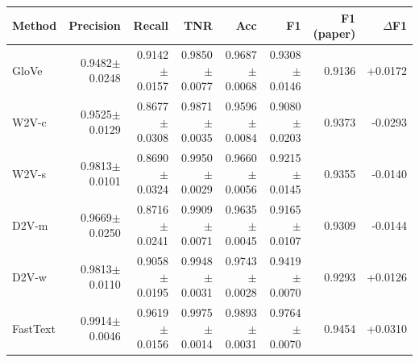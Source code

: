 \begin{tabular}{@{}lrrrrrrr@{}}
\toprule
Method & Precision & Recall & TNR & Acc & F1 & F1 (paper) & $\Delta$F1 \\ \midrule
GloVe & 0.9482$\pm$0.0248 & 0.9142$\pm$0.0157 & 0.9850$\pm$0.0077 & 0.9687$\pm$0.0068 & 0.9308$\pm$0.0146 & 0.9136 & +0.0172 \\
W2V-c & 0.9525$\pm$0.0129 & 0.8677$\pm$0.0308 & 0.9871$\pm$0.0035 & 0.9596$\pm$0.0084 & 0.9080$\pm$0.0203 & 0.9373 & -0.0293 \\
W2V-s & 0.9813$\pm$0.0101 & 0.8690$\pm$0.0324 & 0.9950$\pm$0.0029 & 0.9660$\pm$0.0056 & 0.9215$\pm$0.0145 & 0.9355 & -0.0140 \\
D2V-m & 0.9669$\pm$0.0250 & 0.8716$\pm$0.0241 & 0.9909$\pm$0.0071 & 0.9635$\pm$0.0045 & 0.9165$\pm$0.0107 & 0.9309 & -0.0144 \\
D2V-w & 0.9813$\pm$0.0110 & 0.9058$\pm$0.0195 & 0.9948$\pm$0.0031 & 0.9743$\pm$0.0028 & 0.9419$\pm$0.0070 & 0.9293 & +0.0126 \\
FastText & 0.9914$\pm$0.0046 & 0.9619$\pm$0.0156 & 0.9975$\pm$0.0014 & 0.9893$\pm$0.0031 & 0.9764$\pm$0.0070 & 0.9454 & +0.0310 \\
\bottomrule
\end{tabular}

